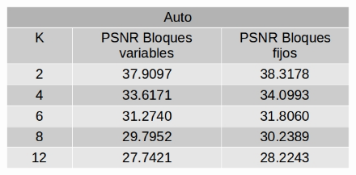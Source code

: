 \documentclass[a4paper]{article}
\begin{document}
    
     \begin{figure}[H]
    \centering
    \includegraphics[scale=0.4]{imagenes/autoMetodosDif.jpg}
	\label{autoe}
    \end{figure}
\end{document}
